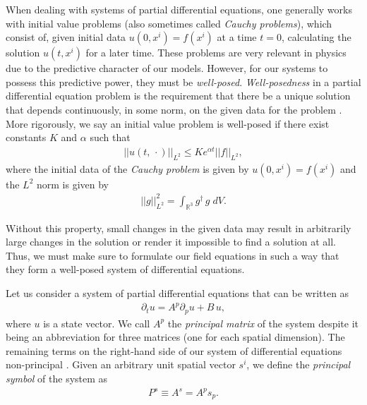 When dealing with systems of partial differential equations, one generally works with initial value problems (also sometimes called \textit{Cauchy problems}), which consist of, given initial data $u(0,x^i) = f(x^i)$ at a time $t = 0$, calculating the solution $u(t,x^i)$ for a later time. These problems are very relevant in physics due to the predictive character of our models. However, for our systems to possess this predictive power, they must be \textit{well-posed}. \textit{Well-posedness} in a partial differential equation problem is the requirement that there be a unique solution that depends continuously, in some norm, on the given data for the problem \cite{AN_INTRODUCTION_TO_WELLPOSEDNESS_AND_FREEEVOLUTION}. More rigorously, we say an initial value problem is well-posed if there exist constants $K$ and $\alpha$ such that
%
\begin{align}
 ||u(t,\, \cdot)||_{L^2} 
     \leq K e^{\alpha t} ||f||_{L^2},
\end{align}
%
where the initial data of the \textit{Cauchy problem} is given by $u(0,x^i) = f(x^i)$ and the $L^2$ norm is given by
%
\begin{align}
    ||g||_{L^2}^2 = \int_{\mathbb{R}^3} g^\dagger\, g \; dV.
\end{align}

Without this property, small changes in the given data may result in arbitrarily large changes in the solution or render it impossible to find a solution at all. Thus, we must make sure to formulate our field equations in such a way that they form a well-posed system of differential equations.

Let us consider a system of partial differential equations that can be written as
%
\begin{align}
    \partial_t u = A^p \partial_p u + B \, u,
    \label{eq:strong_hyp}
\end{align}
%
where $u$ is a state vector. We call $A^p$ the \textit{principal matrix} of the system despite it being an abbreviation for three matrices (one for each spatial dimension). The remaining terms on the right-hand side of our system of differential equations non-principal \cite{AN_INTRODUCTION_TO_WELLPOSEDNESS_AND_FREEEVOLUTION}. Given an arbitrary unit spatial vector $s^i$, we define the \textit{principal symbol} of the system as
%
\begin{align}
    P^s \equiv A^s = A^p s_p.
\end{align}


